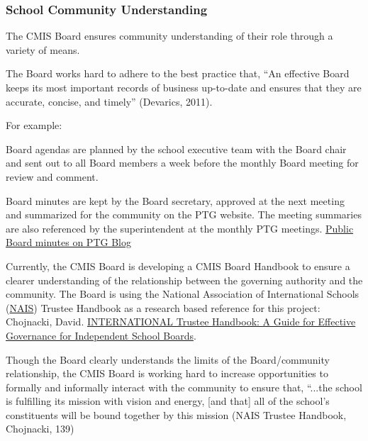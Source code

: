 \subsubsection{School Community Understanding}



\begin{findings}
The CMIS Board ensures community understanding of their role through a variety of means. 

The Board works hard to adhere to the best practice that, “An effective Board keeps its most important records of business up-to-date and ensures that they are accurate, concise, and timely” (Devarics, 2011).

For example:

Board agendas are planned by the school executive team with the Board chair and sent out to all Board members a week before the monthly Board meeting for review and comment. 

Board minutes are kept by the Board secretary, approved at the next meeting and summarized for the community on the PTG website. The meeting summaries are also referenced by the superintendent at the monthly PTG meetings. \href{http://blogs.cmis.ac.th/ptg/public-Board-minutes/}{Public Board minutes on PTG Blog}

Currently, the CMIS Board is developing a CMIS Board Handbook to ensure a clearer understanding of the relationship between the governing authority and the community. The Board is using the National Association of International Schools (\href{http://www.nais.org/Articles/Pages/NAIS-Trustee-Handbook-Resources.aspx}{NAIS}) Trustee Handbook as a research based reference for this project: Chojnacki, David. \href{https://www.nais.org/Bookstore/Pages/ProductDetail.aspx?productid=\%7B47CD9104-BC67-E111-9A8C-00505683000D\%7D}{INTERNATIONAL Trustee Handbook: A Guide for Effective Governance for Independent School Boards}. 

Though the Board clearly understands the limits of the Board/community relationship, the CMIS Board is working hard to increase opportunities to formally and informally interact with the community to ensure that, “...the school is fulfilling its mission with vision and energy, [and that] all  of the school’s constituents will be bound together by this mission (NAIS Trustee Handbook, Chojnacki, 139)  


\end{findings}
